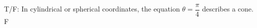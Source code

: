 {T/F: In cylindrical or spherical coordinates, the equation $\theta = \dfrac{\pi}{4}$ describes a cone.
}
{F}